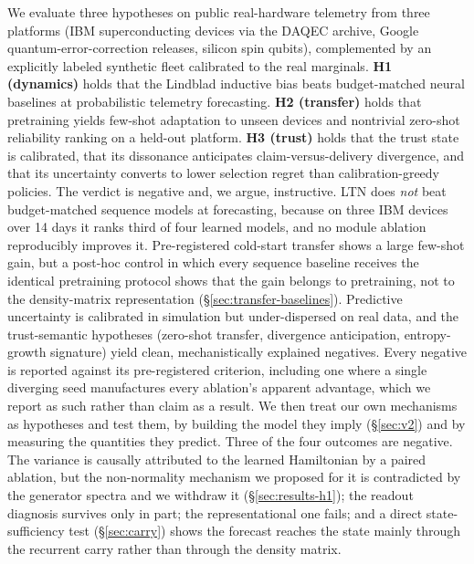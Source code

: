 \documentclass[journal]{IEEEtran}
\begin{document}
We evaluate three hypotheses on public real-hardware telemetry from three
platforms (IBM superconducting devices via the DAQEC archive, Google
quantum-error-correction releases, silicon spin qubits), complemented by an
explicitly labeled synthetic fleet calibrated to the real marginals.
\textbf{H1 (dynamics)} holds that the Lindblad inductive bias beats budget-matched
neural baselines at probabilistic telemetry forecasting. \textbf{H2 (transfer)}
holds that pretraining yields few-shot adaptation to unseen devices and nontrivial
zero-shot reliability ranking on a held-out platform. \textbf{H3 (trust)} holds that
the trust state is calibrated, that its dissonance anticipates claim-versus-delivery
divergence, and that its uncertainty converts to lower selection regret than
calibration-greedy policies. The verdict is negative and, we argue, instructive. LTN
does \emph{not} beat budget-matched sequence models at forecasting, because on three
IBM devices over 14 days it ranks third of four learned models, and no module ablation reproducibly improves it.
Pre-registered cold-start transfer shows a large few-shot gain, but a post-hoc control
in which every sequence baseline receives the identical pretraining protocol
shows that the gain belongs to pretraining, not to the density-matrix representation
(\S\ref{sec:transfer-baselines}). Predictive uncertainty is calibrated in simulation
but under-dispersed on real data, and the trust-semantic hypotheses (zero-shot
transfer, divergence anticipation, entropy-growth signature) yield clean,
mechanistically explained negatives. Every negative is reported against its
pre-registered criterion, including one where a single diverging seed manufactures
every ablation's apparent advantage, which we report as such rather than claim as a
result. We
then treat our own mechanisms as hypotheses and test them, by building the model they
imply (\S\ref{sec:v2}) and by measuring the quantities they predict. Three of the
four outcomes are negative. The variance is causally attributed to the learned
Hamiltonian by a paired ablation, but the non-normality mechanism we proposed for it
is contradicted by the generator spectra and we withdraw it
(\S\ref{sec:results-h1}); the readout diagnosis survives only in part; the
representational one fails; and a direct state-sufficiency test
(\S\ref{sec:carry}) shows the forecast reaches the state mainly through the recurrent
carry rather than through the density matrix.
\end{document}

